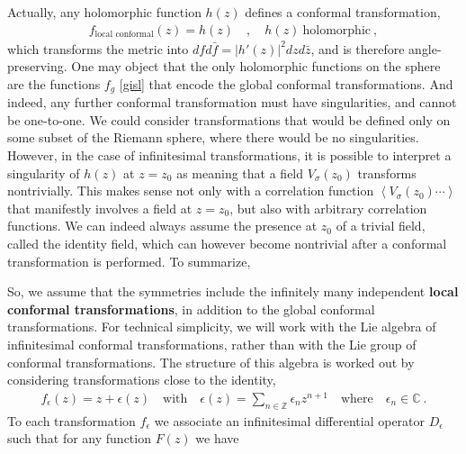 \documentclass[12pt, a4paper, notitlepage, twoside]{report}
\numberwithin{equation}{section}
\theoremstyle{break}
\begin{document}
Actually, any holomorphic function $h(z)$ defines a conformal transformation,
\begin{align}
 f_\text{local conformal}(z) = h(z) \quad , \quad h(z)\ \text{holomorphic}\ , 
\label{flc}
\end{align}
which transforms the metric into $dfd\bar{f} = |h'(z)|^2 dzd\bar{z}$, and is therefore angle-preserving.
One may object that the only holomorphic functions on the sphere are the functions $f_g$ \eqref{gisl} that encode the global conformal transformations.
And indeed, any further conformal transformation must have singularities, and cannot be one-to-one.
We could consider transformations that would be defined only on some subset of the Riemann sphere, where there would be no singularities.
However, in the case of infinitesimal transformations, it is possible to interpret a singularity of $h(z)$ at $z=z_0$ as meaning that a field $V_\sigma(z_0)$ transforms nontrivially.
This makes sense not only with a correlation function $\left\langle V_{\sigma}(z_0)\cdots \right\rangle $ that manifestly involves a field at $z=z_0$, 
but also with arbitrary correlation functions.
We can indeed always assume the presence at $z_0$ of a trivial field, called the identity field, which can however become nontrivial after a conformal transformation is performed.
To summarize,
\begin{center}
\end{center}
So, we assume that the symmetries include the infinitely many independent \textbf{\boldmath local conformal transformations}, in addition to the global conformal transformations.
For technical simplicity, we will work with the Lie algebra of infinitesimal conformal transformations, rather than with the Lie group of conformal transformations.
The structure of this algebra is worked out by considering transformations close to the identity, 
\begin{align}
 f_{\epsilon}(z) = z + \epsilon(z) \quad \text{with} \quad \epsilon(z) = \sum_{n\in{\mathbb{Z}}} \epsilon_n z^{n+1} \quad 
 \text{where} \quad \epsilon_n\in\mathbb{C}\ .
\label{sen}
\end{align}
To each transformation $f_\epsilon$ we associate an infinitesimal differential operator $D_\epsilon$ such that for any function $F(z)$ we have 
\end{document}
